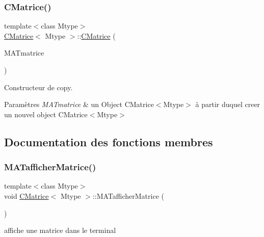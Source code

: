 \subsubsection{\texorpdfstring{C\+Matrice()}{CMatrice()}\hspace{0.1cm}{\footnotesize\ttfamily [3/3]}}
{\footnotesize\ttfamily template$<$class Mtype$>$ \\
\hyperlink{classCMatrice}{C\+Matrice}$<$ Mtype $>$\+::\hyperlink{classCMatrice}{C\+Matrice} (\begin{DoxyParamCaption}\item[{\hyperlink{classCMatrice}{C\+Matrice}$<$ Mtype $>$ \&}]{M\+A\+Tmatrice }\end{DoxyParamCaption})\hspace{0.3cm}{\ttfamily [inline]}}



Constructeur de copy. 


\begin{DoxyParams}{Paramètres}
{\em M\+A\+Tmatrice} & un Object C\+Matrice$<$\+Mtype$>$ à partir duquel creer un nouvel object C\+Matrice$<$\+Mtype$>$ \\
\hline
\end{DoxyParams}


\subsection{Documentation des fonctions membres}
\mbox{\label{classCMatrice_a448fbaa3f221b599abeb8abf3f289881}} 
\subsubsection{\texorpdfstring{M\+A\+Tafficher\+Matrice()}{MATafficherMatrice()}}
{\footnotesize\ttfamily template$<$class Mtype$>$ \\
void \hyperlink{classCMatrice}{C\+Matrice}$<$ Mtype $>$\+::M\+A\+Tafficher\+Matrice (\begin{DoxyParamCaption}{ }\end{DoxyParamCaption})\hspace{0.3cm}{\ttfamily [inline]}}



affiche une matrice dans le terminal 

\mbox{\label{classCMatrice_a690dad053281a665cba4c7d75215e803}} 

